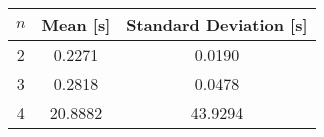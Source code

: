 \begin {tabular}{c|c|c}
$n$ & Mean [s] & Standard Deviation [s]
\\\hline
2 &  0.2271 &  0.0190\\
3 &  0.2818 &  0.0478\\
4 &  20.8882 &  43.9294\\
\end{tabular}
